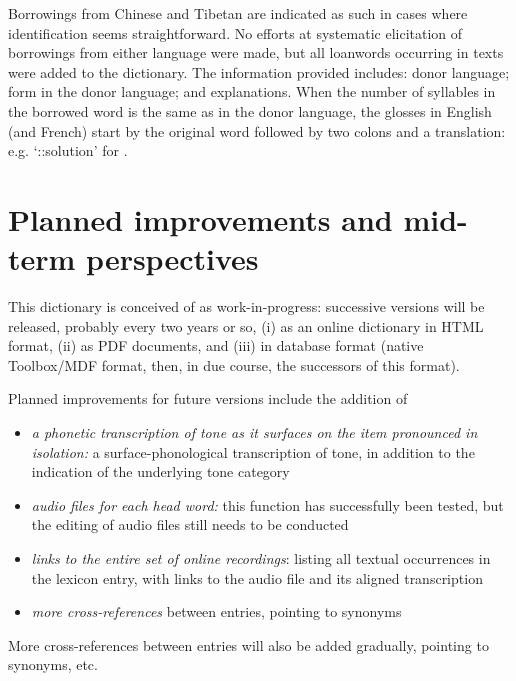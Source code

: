 Borrowings from Chinese and Tibetan are indicated as such in cases where identification seems straightforward. No efforts at systematic elicitation of borrowings from either language were made, but all loanwords occurring in texts were added to the dictionary. The information provided includes: donor language; form in the donor language; and explanations. When the number of syllables in the borrowed word is the same as in the donor language, the glosses in English (and French) start by the original word followed by two colons and a translation: e.g. ‘::solution' for . 

	\section{Planned improvements and mid-term perspectives} \label{sec:improv}
	
This dictionary is conceived of as work-in-progress: successive versions will be released, probably every two years or so, (i) as an online dictionary in HTML format, (ii) as PDF documents, and (iii) in database format (native Toolbox/MDF format, then, in due course, the successors of this format). 

Planned improvements for future versions include the addition of
\begin{itemize}
	\item \textit{a phonetic transcription of tone as it surfaces on the item pronounced in isolation:} a surface-phonological transcription of tone, in addition to the indication of the underlying tone category
	\item \textit{audio files for each head word:} this function has successfully been tested, but the editing of audio files still needs to be conducted
	\item \textit{links to the entire set of online recordings}: listing all textual occurrences in the lexicon entry, with links to the audio file and its aligned transcription
	\item \textit{more cross-references} between entries, pointing to synonyms
\end{itemize}

More cross-references between entries will also be added gradually, pointing to synonyms, etc.

